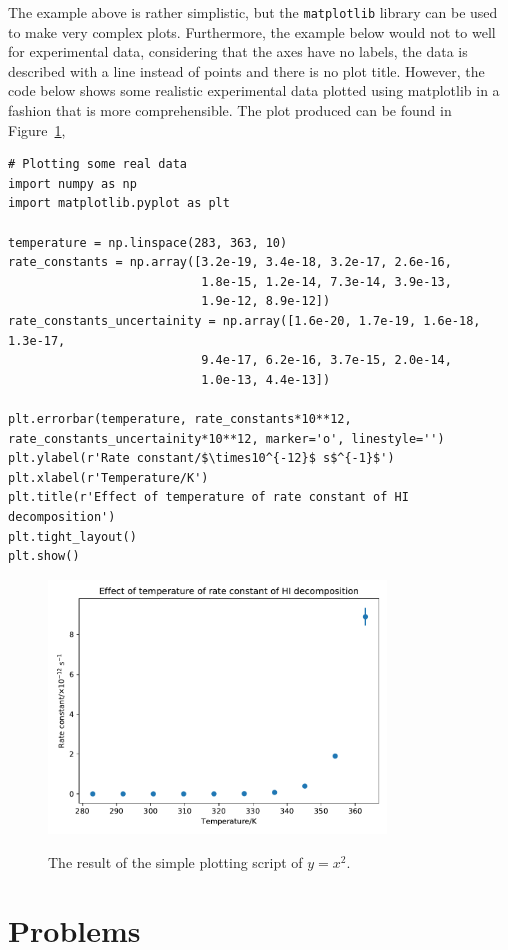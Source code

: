 \documentclass[a4paper]{article}
\begin{document}
The example above is rather simplistic, but the \texttt{matplotlib} library can be used to make very complex plots.
Furthermore, the example below would not to well for experimental data, considering that the axes have no labels, the data is described with a line instead of points and there is no plot title.
However, the code below shows some realistic experimental data plotted using matplotlib in a fashion that is more comprehensible.
The plot produced can be found in Figure~\ref{fig:real},
\begin{lstlisting}
# Plotting some real data
import numpy as np
import matplotlib.pyplot as plt

temperature = np.linspace(283, 363, 10)
rate_constants = np.array([3.2e-19, 3.4e-18, 3.2e-17, 2.6e-16,
                           1.8e-15, 1.2e-14, 7.3e-14, 3.9e-13,
                           1.9e-12, 8.9e-12])
rate_constants_uncertainity = np.array([1.6e-20, 1.7e-19, 1.6e-18, 1.3e-17,
                           9.4e-17, 6.2e-16, 3.7e-15, 2.0e-14,
                           1.0e-13, 4.4e-13])

plt.errorbar(temperature, rate_constants*10**12, rate_constants_uncertainity*10**12, marker='o', linestyle='')
plt.ylabel(r'Rate constant/$\times10^{-12}$ s$^{-1}$')
plt.xlabel(r'Temperature/K')
plt.title(r'Effect of temperature of rate constant of HI decomposition')
plt.tight_layout()
plt.show()
\end{lstlisting}
%
\begin{figure}[t]
\centering
\includegraphics[width=0.8\textwidth]{real}
\label{fig:real}
\caption{The result of the simple plotting script of $y = x ^ 2$.}
\end{figure}
%

\section{Problems}
\end{document}
